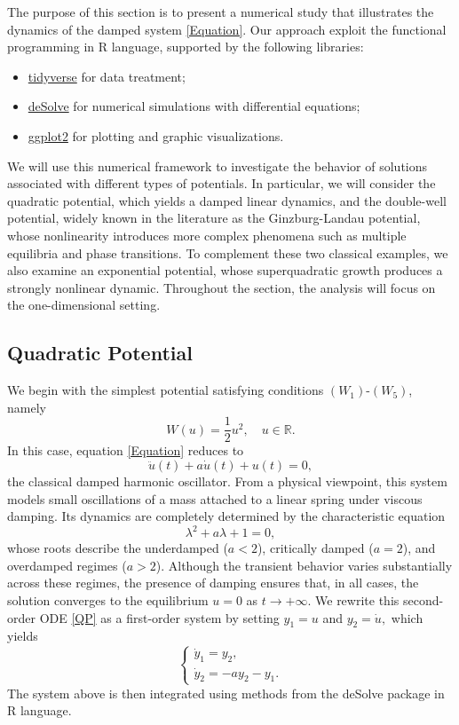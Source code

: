 \documentclass[12pt]{amsart}
\numberwithin{equation}{section}
\begin{document}
The purpose of this section is to present a numerical study that illustrates the dynamics of the damped system \eqref{Equation}. Our approach exploit the functional programming in R language, supported by the following libraries:

\begin{itemize} 
\item[(i)] \href{https://www.tidyverse.org/}{tidyverse} for data treatment; 
\item[(ii)] \href{https://cran.r-project.org/web/packages/deSolve/index.html}{deSolve} for numerical simulations with differential equations; 
\item[(iii)] \href{https://ggplot2.tidyverse.org/}{ggplot2}   for plotting and graphic visualizations. 
\end{itemize}
We will use this numerical framework to investigate the behavior of solutions associated with different types of potentials. In particular, we will consider the quadratic potential, which yields a damped linear dynamics, and the double-well potential, widely known in the literature as the Ginzburg-Landau potential, whose nonlinearity introduces more complex phenomena such as multiple equilibria and phase transitions. To complement these two classical examples, we also examine an exponential potential, whose superquadratic growth produces a strongly nonlinear dynamic. Throughout the section, the analysis will focus on the one-dimensional setting.


\subsection{Quadratic Potential}

We begin with the simplest potential satisfying conditions \hyperlink{W1}{$(W_1)$}-\hyperlink{W5}{$(W_5)$}, namely
$$
W(u)=\frac{1}{2}u^{2},\quad u\in\mathbb{R}.
$$
In this case, equation \eqref{Equation} reduces to
\begin{equation}\label{QP}
	\ddot{u}(t)+a\dot{u}(t)+u(t)=0,
\end{equation}
the classical damped harmonic oscillator. From a physical viewpoint, this system models small oscillations of a mass attached to a linear spring under viscous damping. Its dynamics are completely determined by the characteristic equation
$$
\lambda^{2}+a\lambda+1=0,
$$
whose roots describe the underdamped ($a<2$), critically damped ($a=2$), and overdamped regimes ($a>2$). Although the transient behavior varies substantially across these regimes, the presence of damping ensures that, in all cases, the solution converges to the equilibrium $u=0$ as $t\to +\infty$. We rewrite this second-order ODE \eqref{QP} as a first-order system by setting $y_1 = u$ and $y_2 = \dot{u},$ which yields  
$$
\begin{cases}
	\dot{y}_1 = y_2, \\
	\dot{y}_2 = -a y_2 - y_1.
\end{cases}
$$
The system above is then integrated using methods from the \textsf{deSolve} package in \textsf{R} language. 
\end{document}
